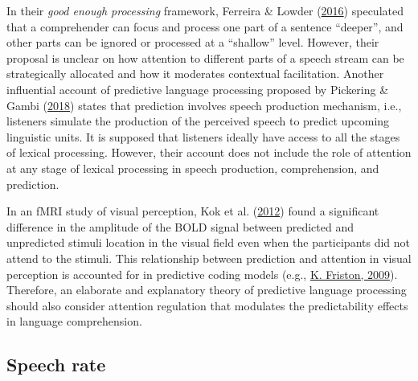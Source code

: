 \documentclass[a4paper, nobind]{templates/ociamthesis}
\begin{document}
In their \emph{good enough processing} framework, Ferreira \& Lowder (\protect\hyperlink{ref-Ferreira2016}{2016}) speculated that a comprehender can focus and process one part of a sentence ``deeper'',
and other parts can be ignored or processed at a ``shallow'' level.
However, their proposal is unclear on how attention to different parts of a speech stream can be strategically allocated
and how it moderates contextual facilitation.
Another influential account of predictive language processing proposed by Pickering \& Gambi (\protect\hyperlink{ref-Pickering2018}{2018}) states that prediction involves speech production mechanism,
i.e., listeners simulate the production of the perceived speech to predict upcoming linguistic units.
It is supposed that listeners ideally have access to all the stages of lexical processing.
However, their account does not include the role of attention at any stage of lexical processing in speech production, comprehension, and prediction.

In an fMRI study of visual perception, Kok et al. (\protect\hyperlink{ref-Kok2012}{2012}) found a significant difference in the amplitude of the BOLD signal between predicted and unpredicted stimuli location in the visual field even when the participants did not attend to the stimuli.
This relationship between prediction and attention in visual perception is accounted for in predictive coding models (e.g., \protect\hyperlink{ref-Friston2009}{K. Friston, 2009}).
Therefore, an elaborate and explanatory theory of predictive language processing should also consider attention regulation that modulates the predictability effects in language comprehension.

\hypertarget{speech-rate}{%
\subsection{Speech rate}\label{speech-rate}}
\end{document}
